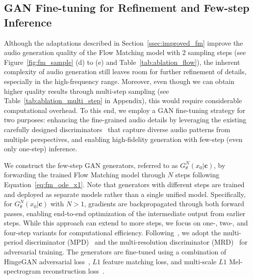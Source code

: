\documentclass{article} %
\begin{document}
\subsection{GAN Fine-tuning for Refinement and Few-step Inference}
\label{ssec:gan_ft}

Although the adaptations described in Section~\ref{ssec:improved_fm} improve the audio generation quality of the Flow Matching model with 2 sampling steps (see Figure~\ref{fig:fm_sample} (d) to (e) and Table~\ref{tab:ablation_flow}), the inherent complexity of audio generation still leaves room for further refinement of details, especially in the high-frequency range. 
Moreover, even though we can obtain higher quality results through multi-step sampling (see Table~\ref{tab:ablation_multi_step} in Appendix), this would require considerable computational overhead. To this end, we employ a GAN fine-tuning strategy for two purposes: enhancing the fine-grained audio details by leveraging the existing carefully designed discriminators~\citep{hifigan, mrd} that capture diverse audio patterns from multiple perspectives, and enabling high-fidelity generation with few-step (even only one-step) inference. 

We construct the few-step GAN generators, referred to as $G_{\theta}^N(x_0|\mathbf{c})$, by forwarding the trained Flow Matching model through $N$ steps following Equation~\ref{eq:fm_ode_x1}. 
Note that generators with different steps are trained and deployed as separate models rather than a single unified model.
Specifically, for $G_{\theta}^N(x_0|\mathbf{c})$ with $N>1$, gradients are backpropagated through both forward passes, enabling end-to-end optimization of the intermediate output from earlier steps. While this approach can extend to more steps, we focus on one-, two-, and four-step variants for computational efficiency. Following~\citep{vocos}, we adopt the multi-period discriminator (MPD)~\citep{hifigan} and the multi-resolution discriminator (MRD)~\citep{mrd} for adversarial training. The generators are fine-tuned using a combination of HingeGAN adversarial loss~\citep{hingegan}, $L1$ feature matching loss, and multi-scale $L1$ Mel-spectrogram reconstruction loss~\citep{dac}. 
\end{document}
